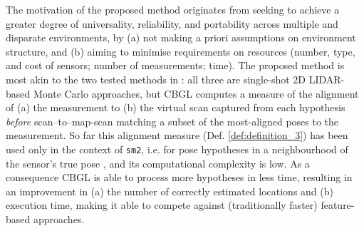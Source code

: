 The motivation of the proposed method originates from seeking to achieve a
greater degree of universality, reliability, and portability across multiple
and disparate environments, by (a) not making a priori assumptions on
environment structure, and (b) aiming to minimise requirements on resources
(number, type, and cost of sensors; number of measurements; time). The proposed
method is most akin to the two tested methods in \cite{Filotheou2022g}: all
three are single-shot 2D LIDAR-based Monte Carlo approaches, but CBGL computes
a measure of the alignment of (a) the measurement to (b) the virtual scan
captured from each hypothesis \textit{before} scan--to--map-scan matching a
subset of the most-aligned poses to the measurement. So far this  alignment
measure (Def. \ref{def:definition_3}) has been used only in the context of
\texttt{sm2}, i.e. for pose hypotheses in a neighbourhood of the sensor's true
pose \cite{Filotheou2022f,Filotheou2023a}, and its computational complexity is
low. As a consequence CBGL is able to process more hypotheses in less time,
resulting in an improvement in (a) the number of correctly estimated locations
and (b) execution time, making it able to compete against (traditionally
faster) feature-based approaches.

